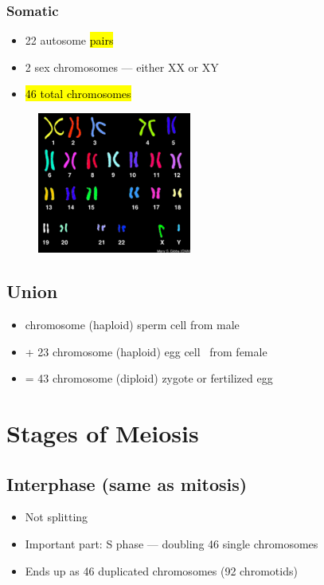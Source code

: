 \documentclass[a4paper,12pt]{article}
\begin{document}
\subsubsection{Somatic}
\begin{itemize}
    \item{22 autosome \hl{pairs}}
    \item{2 sex chromosomes --- either \female XX or \male XY}
    \item{\hl{46 total chromosomes}}
\end{itemize}

\begin{figure}[H]
    \centering
    \includegraphics[width=0.45\textwidth]{46}
\end{figure}

\subsection{Union}
\begin{itemize}
    \item{\;\;\; chromosome (haploid) sperm cell from \male\! male}
    \item{+ 23 chromosome (haploid) egg cell \;\;\,\,\,from \female\! female}
    \item{= 43 chromosome (diploid) zygote or fertilized egg}
\end{itemize}

\section{Stages of Meiosis}

\subsection{Interphase (same as mitosis)}
\begin{itemize}
    \item{Not splitting}
    \item{Important part: S phase --- doubling 46 single chromosomes}
    \item{Ends up as 46 duplicated chromosomes (92 chromotids)}
\end{itemize}
\end{document}
